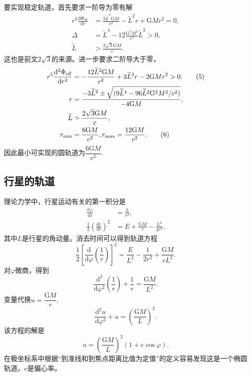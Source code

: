 \documentclass[11pt, a4paper, oneside, onecolumn]{ctexart}
\numberwithin{equation}{subsection}
\begin{document}
要实现稳定轨道，首先要求一阶导为零有解
\begin{align}
r^{4}\frac{\mathrm{d}\Phi_{\text{eff}}}{\mathrm{d}r}&=\frac{3\widetilde{L}^{2}\mathrm{G}M}{c^{2}}-\widetilde{L}^{2}r+\mathrm{G}Mr^{2}=0,\\
\Delta{}&=\widetilde{L}^{4}-12\frac{\mathrm{G}^{2}M^{2}}{c^{2}}\widetilde{L}^{2}>0,\\
\widetilde{L}&>\frac{2\sqrt{3}\mathrm{G}M}{c}.
\end{align}
这也是前文$2\sqrt{3}$的来源。进一步要求二阶导大于零，
\begin{align}
r^{5}\frac{\mathrm{d}^{2}\Phi_{\text{eff}}}{\mathrm{d}r^{2}}&=-\frac{12\widetilde{L}^{2}\mathrm{G}M}{c^{2}}+3\widetilde{L}^{2}r-2\mathrm{G}Mr^{2}>0.\tag{5}\\
r&=\frac{-3\widetilde{L}^{2}\pm\sqrt{(9\widetilde{L}^{4}-96\widetilde{L}^{2}\mathrm{G}^{2}M^{2}/c^{2})}}{-4\mathrm{G}M},\notag\\
\widetilde{L}&>\frac{2\sqrt3\mathrm{G}M}{c},\notag\\
r_{\min}&=\frac{6\mathrm{G}M}{c^{2}},r_{\max}=\frac{12\mathrm{G}M}{c^{2}}.\tag{6}
\end{align}
因此最小可实现的圆轨道为$\dfrac{6\mathrm{G}M}{c^{2}}$.

\subsection{行星的轨道}
理论力学中，行星运动有关的第一积分是
\begin{align}
\frac{\mathrm{d}\varphi}{\mathrm{d}t}&=\frac{L}{r^{2}},\\
\frac12\left(\frac{\mathrm{d}r}{\mathrm{d}t}\right)^{2}&=E+\frac{\mathrm{G}M}{r}-\frac{L^{2}}{2r^{2}}.
\end{align}
其中$L$是行星的角动量。消去时间可以得到轨道方程
\begin{equation}
\frac{1}{2}\left[\frac{\mathrm{d}}{\mathrm{d}\varphi}\left(\frac{1}{r}\right)\right]^{2}=\frac{E}{L^{2}}-\frac{1}{2r^{2}}+\frac{\mathrm{G}M}{rL^{2}}.
\end{equation}
对$\varphi$微商，得到
\begin{equation}
\frac{\mathrm{d}^{2}}{\mathrm{d}\varphi^{2}}\left(\frac{1}{r}\right)+\frac{1}{r}=\frac{\mathrm{G}M}{L^{2}}.
\end{equation}
变量代换$u=\dfrac{\mathrm{G}M}{r}$,
\begin{equation}
\frac{\mathrm{d}^{2}u}{\mathrm{d}\varphi^{2}}+u=\left(\frac{\mathrm{G}M}{L}\right)^{2}.
\end{equation}
该方程的解是
\begin{equation}
u=\left(\frac{\mathrm{G}M}{L}\right)^{2}\left(1+e\cos\varphi\right).
\end{equation}
在极坐标系中根据“到准线和到焦点距离比值为定值”的定义容易发现这是一个椭圆轨道。$e$是偏心率。
\end{document}
